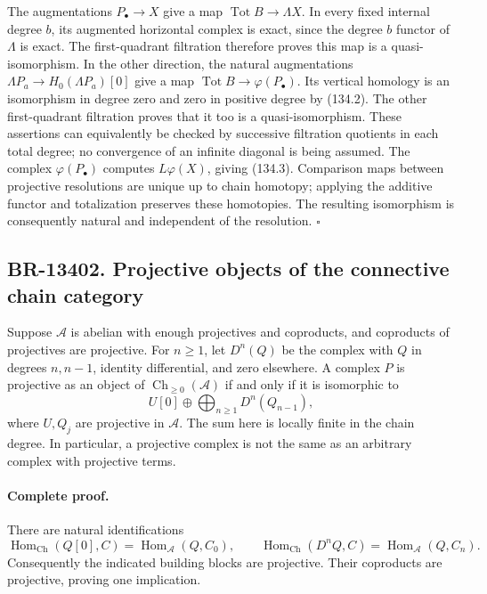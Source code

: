 \documentclass[11pt,a4paper]{article}
\theoremstyle{definition}\newtheorem{definition}[theorem]{Definition}
\theoremstyle{remark}\newtheorem{remark}[theorem]{Remark}
\begin{document}
The augmentations \(P_\bullet\to X\) give a map
\(\operatorname{Tot}B\to\Lambda X\).  In every fixed internal degree
\(b\), its augmented horizontal complex is exact, since the degree
\(b\) functor of \(\Lambda\) is exact.  The first-quadrant filtration
therefore proves this map is a quasi-isomorphism.  In the other
direction, the natural augmentations
\(\Lambda P_a\to H_0(\Lambda P_a)[0]\) give a map
\(\operatorname{Tot}B\to\varphi(P_\bullet)\).  Its vertical homology
is an isomorphism in degree zero and zero in positive degree by
(134.2).  The other first-quadrant filtration proves that it too is a
quasi-isomorphism.  These assertions can equivalently be checked by
successive filtration quotients in each total degree; no convergence
of an infinite diagonal is being assumed.  The complex
\(\varphi(P_\bullet)\) computes \(L\varphi(X)\), giving (134.3).
Comparison maps between projective resolutions are unique up to chain
homotopy; applying the additive functor and totalization preserves
these homotopies.  The resulting isomorphism is consequently natural
and independent of the resolution. \(\square\)

\subsection{BR-13402. Projective objects of the connective chain category}
Suppose \(\mathcal A\) is abelian with enough projectives and
coproducts, and coproducts of projectives are projective.  For
\(n\geq1\), let \(D^n(Q)\) be the complex with \(Q\) in degrees
\(n,n-1\), identity differential, and zero elsewhere.  A complex
\(P\) is projective as an object of
\(\operatorname{Ch}_{\geq0}(\mathcal A)\) if and only if it is
isomorphic to
\[
 U[0]\oplus\bigoplus_{n\geq1}D^n(Q_{n-1}),
 \tag{134.4}
\]
where \(U,Q_j\) are projective in \(\mathcal A\).  The sum here is
locally finite in the chain degree.  In particular, a projective
complex is not the same as an arbitrary complex with projective terms.

\paragraph{Complete proof.}
There are natural identifications
\[
 \operatorname{Hom}_{\mathrm{Ch}}(Q[0],C)
   =\operatorname{Hom}_{\mathcal A}(Q,C_0),\qquad
 \operatorname{Hom}_{\mathrm{Ch}}(D^nQ,C)
   =\operatorname{Hom}_{\mathcal A}(Q,C_n).
\]
Consequently the indicated building blocks are projective.  Their
coproducts are projective, proving one implication.
\end{document}
